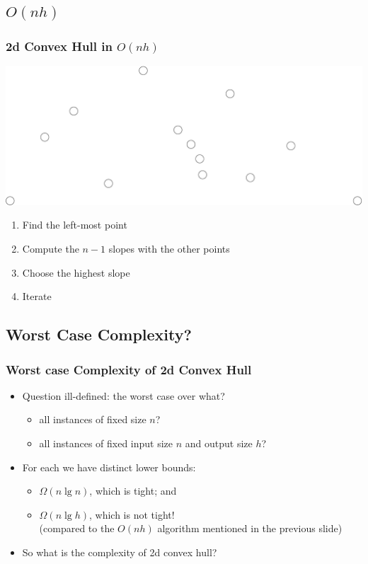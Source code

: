 \subsection{$O(nh)$}
\begin{frame}
  \frametitle{2d Convex Hull in $O(nh)$}
  \includegraphics[width=\textwidth]{points}
  \begin{enumerate}
  \item Find the left-most point
  \item Compute the $n-1$ slopes with the other points
  \item Choose the highest slope
  \item Iterate 
  \end{enumerate}
\end{frame}


\subsection{Worst Case Complexity?}

\begin{frame}
  \frametitle{Worst case Complexity of 2d Convex Hull}
  \begin{itemize}
  \item Question ill-defined: the worst case over what?
    \begin{itemize}
    \item all instances of fixed size $n$?
    \item all instances of fixed input size $n$ and output size $h$?
    \end{itemize}
  \item For each we have distinct lower bounds:
    \begin{itemize}
    \item $\Omega(n\lg n)$, which is tight; and
    \item $\Omega(n\lg h)$, which is \alert{not} tight! \\
{\tiny (compared to the $O(nh)$ algorithm mentioned in the previous slide)}
    \end{itemize}
  \item So what is the complexity of 2d convex hull?
  \end{itemize}
\end{frame}



